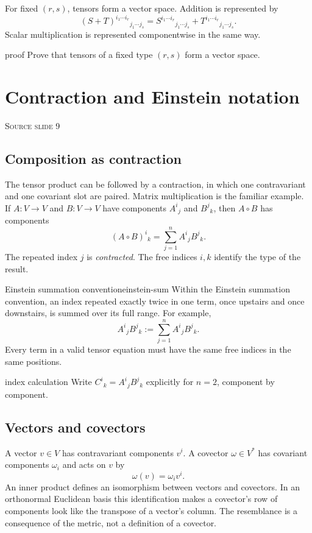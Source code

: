 \documentclass[11pt,a4paper]{article}
\newcommand{\slideref}[1]{%
  \par\smallskip
  {\footnotesize\color{ink!60}\textsc{Source slide #1}}\par
}
\begin{document}
For fixed \((r,s)\), tensors form a vector space. Addition is represented by
\[
  (S+T)^{i_1\cdots i_r}{}_{j_1\cdots j_s}
  =S^{i_1\cdots i_r}{}_{j_1\cdots j_s}
   +T^{i_1\cdots i_r}{}_{j_1\cdots j_s}.
\]
Scalar multiplication is represented componentwise in the same way.

\begin{studentwork}[height=8.5cm]{proof}
Prove that tensors of a fixed type \((r,s)\) form a vector space.
\end{studentwork}

\section{Contraction and Einstein notation}
\slideref{9}

\subsection{Composition as contraction}

The tensor product can be followed by a contraction, in which one
contravariant and one covariant slot are paired. Matrix multiplication is the
familiar example. If \(A:V\to V\) and \(B:V\to V\) have components
\(A^i{}_{j}\) and \(B^j{}_{k}\), then \(A\circ B\) has components
\[
  (A\circ B)^i{}_{k}
  =\sum_{j=1}^{n}A^i{}_{j}B^j{}_{k}.
\]
The repeated index \(j\) is \emph{contracted}. The free indices \(i,k\)
identify the type of the result.

\begin{definition}{Einstein summation convention}{einstein-sum}
Within the Einstein summation convention, an index repeated exactly twice in
one term, once upstairs and once downstairs, is summed over its full range. For
example,
\[
  A^i{}_{j}B^j{}_{k}
  :=\sum_{j=1}^{n}A^i{}_{j}B^j{}_{k}.
\]
Every term in a valid tensor equation must have the same free indices in the
same positions.
\end{definition}

\begin{studentwork}[height=5.2cm]{index calculation}
Write \(C^i{}_{k}=A^i{}_{j}B^j{}_{k}\) explicitly for \(n=2\), component by
component.
\end{studentwork}

\subsection{Vectors and covectors}

A vector \(v\in V\) has contravariant components \(v^i\). A covector
\(\omega\in V^*\) has covariant components \(\omega_i\) and acts on \(v\) by
\[
  \omega(v)=\omega_i v^i.
\]
An inner product defines an isomorphism between vectors and covectors. In an
orthonormal Euclidean basis this identification makes a covector's row of
components look like the transpose of a vector's column. The resemblance is a
consequence of the metric, not a definition of a covector.
\end{document}
